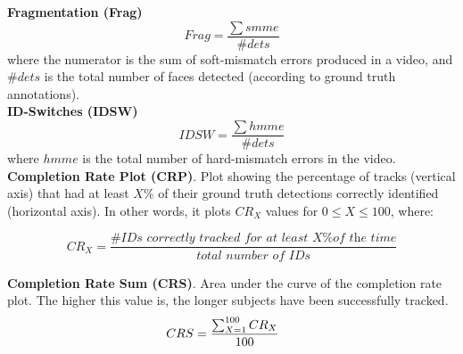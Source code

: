 \noindent\textbf{Fragmentation (Frag)} 
\begin{equation*}
    Frag=\frac{\sum{smme}}{\#dets}
\end{equation*}
where the numerator is the sum of soft-mismatch errors produced in a video, and $\#dets$ is the total number of faces detected (according to ground truth annotations).\\

\noindent\textbf{ID-Switches (IDSW)}
\begin{equation*}
    IDSW=\frac{\sum{hmme}}{\#dets}
\end{equation*}
where $hmme$ is the total number of hard-mismatch errors in the video.\\

\noindent\textbf{Completion Rate Plot (CRP)}. 
Plot showing the percentage of tracks (vertical axis) that had at least $X\%$ of their ground truth detections correctly identified (horizontal axis). In other words, it plots $CR_{X}$ values for $0\leq X \leq 100$, where:

\begin{equation*}
    CR_X=\frac{\textit{\# IDs correctly tracked for at least X\% of the time}}{\textit{total number of IDs}}
\end{equation*}


\noindent\textbf{Completion Rate Sum (CRS)}. 
Area under the curve of the completion rate plot. The higher this value is, the longer subjects have been successfully tracked.
\begin{equation*}
    CRS=\frac{\sum_{X=1}^{100}{CR_X}}{100}\hspace{0.5cm}
\end{equation*}



